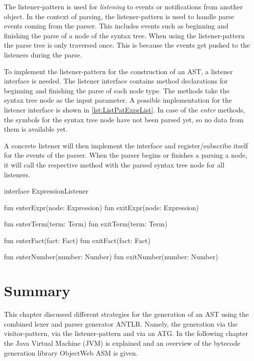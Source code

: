The listener-pattern is used for \textit{listening} to events or notifications from another object. In the context of parsing, the listener-pattern is used to handle parse events coming from the parser. This includes events such as beginning and finishing the parse of a node of the syntax tree. When using the listener-pattern the parse tree is only traversed once. This is because the events get pushed to the listeners during the parse. 

To implement the listener-pattern for the construction of an AST, a listener interface is needed. The listener interface contains method declarations for beginning and finishing the parse of each node type. The methods take the syntax tree node as the input parameter. A possible implementation for the listener interface is shown in \ref{lst:ListPatExprList}. In case of the \textit{enter} methods, the symbols for the syntax tree node have not been parsed yet, so no data from them is available yet.

A concrete listener will then implement the interface and register/subscribe itself for the events of the parser. When the parser begins or finishes a parsing a node, it will call the respective method with the parsed syntax tree node for all listeners. 

\begin{KotlinCode}[float,numbers=none,caption=Implementation of the \texttt{ExpressionListener} interface., label=lst:ListPatExprList]
interface ExpressionListener {
    fun enterExpr(node: Expression)
    fun exitExpr(node: Expression)

    fun enterTerm(term: Term)
    fun exitTerm(term: Term)

    fun enterFact(fact: Fact)
    fun exitFact(fact: Fact)

    fun enterNumber(number: Number)
    fun exitNumber(number: Number)
}
  \end{KotlinCode}

\section{Summary}

This chapter discussed different strategies for the generation of an AST using the combined lexer and parser generator ANTLR. Namely, the generation via the visitor-pattern, via the listener-pattern and via an ATG. In the following chapter the Java Virtual Machine (JVM) is explained and an overview of the bytecode generation library ObjectWeb ASM is given. 